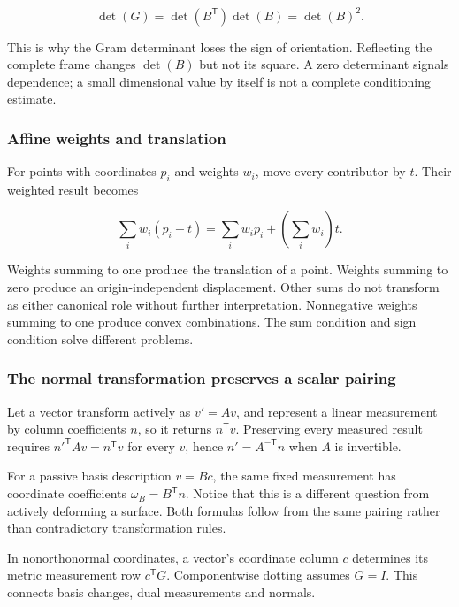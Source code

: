\[
\det(G)=\det(B^\mathsf T)\det(B)=\det(B)^2.
\]

This is why the Gram determinant loses the sign of orientation. Reflecting the complete frame changes \(\det(B)\) but not its square. A zero determinant signals dependence; a small dimensional value by itself is not a complete conditioning estimate.

\subsubsection{Affine weights and translation}\label{02-foundations-ii-ch039-affine-weights-and-translation}

For points with coordinates \(p_i\) and weights \(w_i\), move every contributor by \(t\). Their weighted result becomes

\[
\sum_iw_i(p_i+t)=\sum_iw_ip_i+\left(\sum_iw_i\right)t.
\]

Weights summing to one produce the translation of a point. Weights summing to zero produce an origin-independent displacement. Other sums do not transform as either canonical role without further interpretation. Nonnegative weights summing to one produce convex combinations. The sum condition and sign condition solve different problems.

\subsubsection{The normal transformation preserves a scalar pairing}\label{02-foundations-ii-ch039-the-normal-transformation-preserves-a-scalar-pairing}

Let a vector transform actively as \(v'=Av\), and represent a linear measurement by column coefficients \(n\), so it returns \(n^\mathsf Tv\). Preserving every measured result requires \(n'^\mathsf TAv=n^\mathsf Tv\) for every \(v\), hence \(n'=A^{-\mathsf T}n\) when \(A\) is invertible.

For a passive basis description \(v=Bc\), the same fixed measurement has coordinate coefficients \(\omega_B=B^\mathsf Tn\). Notice that this is a different question from actively deforming a surface. Both formulas follow from the same pairing rather than contradictory transformation rules.

In nonorthonormal coordinates, a vector's coordinate column \(c\) determines its metric measurement row \(c^\mathsf TG\). Componentwise dotting assumes \(G=I\). This connects basis changes, dual measurements and normals.

